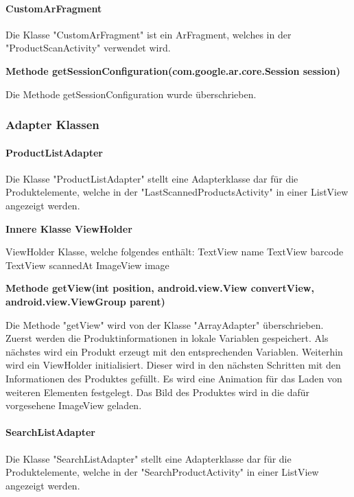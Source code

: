 \documentclass{scrartcl}
\begin{document}
\paragraph{CustomArFragment}
Die Klasse "CustomArFragment" ist ein ArFragment, welches in der "ProductScanActivity" verwendet wird. \newline 

\noindent\textbf{Methode getSessionConfiguration(com.google.ar.core.Session session)}

\noindent Die Methode getSessionConfiguration wurde überschrieben. \newline 

\subsubsection{Adapter Klassen}

\paragraph{ProductListAdapter}
Die Klasse "ProductListAdapter" stellt eine Adapterklasse dar für die Produktelemente, welche in der "LastScannedProductsActivity" in einer ListView angezeigt werden. \newline 

\noindent\textbf{Innere Klasse ViewHolder}

\noindent ViewHolder Klasse, welche folgendes enthält: TextView name TextView barcode TextView scannedAt ImageView image \newline 

\noindent\textbf{Methode getView(int position, \newline                                android.view.View convertView, android.view.ViewGroup parent)}

\noindent Die Methode "getView" wird von der Klasse "ArrayAdapter" überschrieben. Zuerst werden die Produktinformationen in lokale Variablen gespeichert. Als nächstes wird ein Produkt erzeugt mit den entsprechenden Variablen. Weiterhin wird ein ViewHolder initialisiert. Dieser wird in den nächsten Schritten mit den Informationen des Produktes gefüllt. Es wird eine Animation für das Laden von weiteren Elementen festgelegt. Das Bild des Produktes wird in die dafür vorgesehene ImageView geladen. \newline 

\paragraph{SearchListAdapter}
Die Klasse "SearchListAdapter" stellt eine Adapterklasse dar für die Produktelemente, welche in der "SearchProductActivity" in einer ListView angezeigt werden. \newline 
\end{document}
